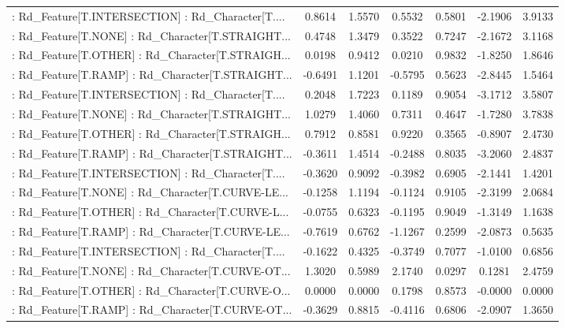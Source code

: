 \begin{longtable}{p{4cm}cccccc}
 : Rd\_Feature[T.INTERSECTION] : Rd\_Character[T.... &  0.8614 &    1.5570 &  0.5532 &       0.5801 & -2.1906 &  3.9133 \\
 : Rd\_Feature[T.NONE] : Rd\_Character[T.STRAIGHT... &  0.4748 &    1.3479 &  0.3522 &       0.7247 & -2.1672 &  3.1168 \\
 : Rd\_Feature[T.OTHER] : Rd\_Character[T.STRAIGH... &  0.0198 &    0.9412 &  0.0210 &       0.9832 & -1.8250 &  1.8646 \\
 : Rd\_Feature[T.RAMP] : Rd\_Character[T.STRAIGHT... & -0.6491 &    1.1201 & -0.5795 &       0.5623 & -2.8445 &  1.5464 \\
 : Rd\_Feature[T.INTERSECTION] : Rd\_Character[T.... &  0.2048 &    1.7223 &  0.1189 &       0.9054 & -3.1712 &  3.5807 \\
 : Rd\_Feature[T.NONE] : Rd\_Character[T.STRAIGHT... &  1.0279 &    1.4060 &  0.7311 &       0.4647 & -1.7280 &  3.7838 \\
 : Rd\_Feature[T.OTHER] : Rd\_Character[T.STRAIGH... &  0.7912 &    0.8581 &  0.9220 &       0.3565 & -0.8907 &  2.4730 \\
 : Rd\_Feature[T.RAMP] : Rd\_Character[T.STRAIGHT... & -0.3611 &    1.4514 & -0.2488 &       0.8035 & -3.2060 &  2.4837 \\
 : Rd\_Feature[T.INTERSECTION] : Rd\_Character[T.... & -0.3620 &    0.9092 & -0.3982 &       0.6905 & -2.1441 &  1.4201 \\
 : Rd\_Feature[T.NONE] : Rd\_Character[T.CURVE-LE... & -0.1258 &    1.1194 & -0.1124 &       0.9105 & -2.3199 &  2.0684 \\
 : Rd\_Feature[T.OTHER] : Rd\_Character[T.CURVE-L... & -0.0755 &    0.6323 & -0.1195 &       0.9049 & -1.3149 &  1.1638 \\
 : Rd\_Feature[T.RAMP] : Rd\_Character[T.CURVE-LE... & -0.7619 &    0.6762 & -1.1267 &       0.2599 & -2.0873 &  0.5635 \\
 : Rd\_Feature[T.INTERSECTION] : Rd\_Character[T.... & -0.1622 &    0.4325 & -0.3749 &       0.7077 & -1.0100 &  0.6856 \\
 : Rd\_Feature[T.NONE] : Rd\_Character[T.CURVE-OT... &  1.3020 &    0.5989 &  2.1740 &       0.0297 &  0.1281 &  2.4759 \\
 : Rd\_Feature[T.OTHER] : Rd\_Character[T.CURVE-O... &  0.0000 &    0.0000 &  0.1798 &       0.8573 & -0.0000 &  0.0000 \\
 : Rd\_Feature[T.RAMP] : Rd\_Character[T.CURVE-OT... & -0.3629 &    0.8815 & -0.4116 &       0.6806 & -2.0907 &  1.3650 \\

\end{longtable}
